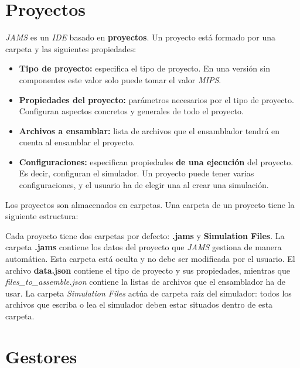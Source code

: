 \section{Proyectos}\label{sec:interfaz-grafica}

\textit{JAMS} es un \textit{IDE} basado en \textbf{proyectos}.
Un proyecto está formado por una carpeta y las siguientes propiedades:
\begin{itemize}
    \item \textbf{Tipo de proyecto:} especifica el tipo de proyecto.
    En una versión sin componentes este valor solo puede tomar el valor \textit{MIPS}.
    \item \textbf{Propiedades del proyecto:} parámetros necesarios por el tipo de proyecto.
    Configuran aspectos concretos y generales de todo el proyecto.
    \item \textbf{Archivos a ensamblar:} lista de archivos que el ensamblador tendrá en cuenta
    al ensamblar el proyecto.
    \item \textbf{Configuraciones:} especifican propiedades \textbf{de una ejecución} del proyecto.
    Es decir, configuran el simulador.
    Un proyecto puede tener varias configuraciones, y el usuario ha de elegir una al crear una
    simulación.
\end{itemize}

\noindent Los proyectos son almacenados en carpetas.
Una carpeta de un proyecto tiene la siguiente estructura:

\begin{center}
\end{center}

\noindent Cada proyecto tiene dos carpetas por defecto: \textbf{.jams} y
\textbf{Simulation Files}.
La carpeta \textbf{.jams} contiene los datos del proyecto que \textit{JAMS}
gestiona de manera automática.
Esta carpeta está oculta y no debe ser modificada por el usuario.
El archivo \textbf{data.json} contiene el tipo de proyecto y sus propiedades,
mientras que \textit{files\_to\_assemble.json} contiene la listas de archivos
que el ensamblador ha de usar.
La carpeta \textit{Simulation Files} actúa de carpeta raíz del simulador:
todos los archivos que escriba o lea el simulador deben estar situados dentro
de esta carpeta.


\section{Gestores}\label{sec:gestores}

